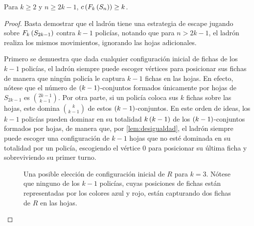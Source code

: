 \begin{teorema}
\label{teo:cota_estrella}
    Para $k\geq 2$ y $n\geq 2k-1$, $c\left( F_{k}\left( S_n\right)\right) \geq k$.
\end{teorema}


\begin{proof}
    Basta demostrar que el ladr\'on tiene una estrategia de escape jugando sobre
    $F_{k}\left( S_{2k-1}\right)$ contra $k-1$ polic\'ias, notando que para $n > 2k-1$, el
    ladr\'on realiza los mismos movimientos, ignorando las hojas adicionales.

    Primero se demuestra que dada cualquier configuraci\'on inicial de fichas de
    los $k-1$ polic\'ias, el ladr\'on siempre puede escoger v\'ertices para
    posicionar sus fichas de manera que ning\'un polic\'ia le captura $k-1$
    fichas en las hojas. En efecto, n\'otese que el n\'umero de
    $\left( k-1\right)$-conjuntos formados \'unicamente por hojas de $S_{2k-1}$ es
    $\binom{2k-1}{k-1}$. Por otra parte, si un polic\'ia coloca sus $k$ fichas
    sobre las hojas, este domina $\binom{k}{k-1}$ de estos
    $\left( k-1\right)$-conjuntos. En este orden de ideas, los $k-1$ polic\'ias pueden
    dominar en su totalidad $k\left( k-1\right)$ de los $\left( k-1\right)$-conjuntos
    formados por hojas, de manera que, por \cref{lem:desigualdad}, el ladr\'on
    siempre puede escoger una configuraci\'on de $k-1$ hojas que no est\'e
    dominada en su totalidad por un polic\'ia, escogiendo el v\'ertice $0$ para
    posicionar su \'ultima ficha y sobreviviendo su primer turno. 

    \begin{figure}[h]
        \centering
        \caption{Una posible elecci\'on de configuraci\'on inicial de $R$ para
        $k=3$. N\'otese que ninguno de los $k-1$ polic\'ias, cuyas posiciones de
        fichas est\'an representadas por los colores azul y rojo, est\'an
        capturando dos fichas de $R$ en las hojas.}
        \label{fig:Configuracion_inicial}
    \end{figure}


\end{proof}
